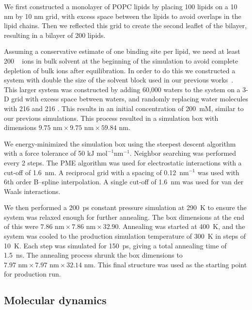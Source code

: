 We first constructed a monolayer of POPC lipids by placing 100 lipids on
a 10 nm by 10 nm grid, with excess space between the lipids to avoid overlaps in the lipid chains. 
Then we reflected this grid to create the second 
leaflet of the bilayer, resulting in a bilayer of 200 lipids. 

Assuming a conservative estimate of one binding site per lipid, we
need at least 200 \na~ ions in bulk solvent at the beginning of the simulation
to avoid complete depletion of bulk ions after equilibration. 
In order to do this we constructed a system with
double the size of the solvent block used in our previous
works~\cite{kruczek:2017,kruczek:2019}.  This larger system was
constructed by adding 60,000 waters to the system on a 3-D grid with
    excess space between waters, and randomly
replacing water molecules with 216 \na and 216 \cl. 
This results in an initial concentration of 200~mM, similar to our previous simulations.
This process resulted in a simulation box with dimensions $9.75  \text{~nm}\times9.75  \text{~nm}\times59.84 \text{~nm}$.

We energy-minimized the simulation box using the steepest descent
algorithm with a force tolerance of 50 $\text{kJ mol}^{-1}\text{nm}^{-1}$. 
Neighbor searching was performed every 2 steps. 
The PME algorithm was used for electrostatic interactions with a cut-off of 1.6~nm. 
A reciprocal grid with a spacing of 0.12~nm$^{-1}$ was used with 6th order B--spline interpolation. 
A single cut-off of 1.6~nm was used for van der Waals interactions.

We then performed a 200~ps constant pressure simulation at 290~K to
ensure the system was relaxed enough for further annealing. 
The box dimensions at the end of this were $7.86\text{~nm}\times7.86\text{~nm}\times32.90$.
Annealing was started at 400~K, and the system was cooled to the production
simulation temperature of 300~K in steps of 10~K. 
Each step was simulated for 150~ps, giving a total annealing time of 1.5~ns. 
The annealing process shrunk the box dimensions to $7.97\text{~nm}\times7.97\text{~nm}\times32.14\text{~nm}$.
This final structure 
was used as the starting point for production run.

\subsection{Molecular dynamics}

